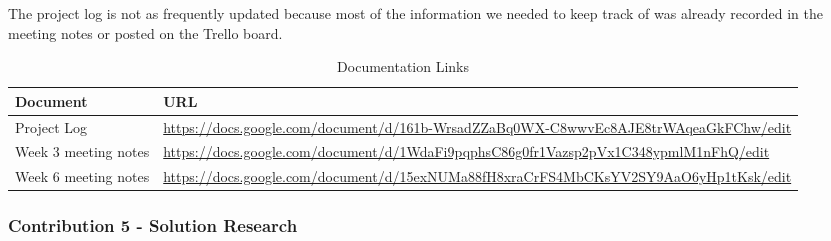 \documentclass{article}
\begin{document}
    The project log is not as frequently updated because most of the information we needed to keep track of was already recorded in the meeting notes or posted on the Trello board.

    \begin{xltabular}{\textwidth}{p{4cm} X}
    \caption{Documentation Links} \\
    \hline
    \textbf{Document} & \textbf{URL} \\
    \hline

    Project Log & \url{https://docs.google.com/document/d/161b-WrsadZZaBq0WX-C8wwvEc8AJE8trWAqeaGkFChw/edit} \\
    Week 3 meeting notes & \url{https://docs.google.com/document/d/1WdaFi9pqphsC86g0fr1Vazsp2pVx1C348ypmlM1nFhQ/edit} \\
    Week 6 meeting notes & \url{https://docs.google.com/document/d/15exNUMa88fH8xraCrFS4MbCKsYV2SY9AaO6yHp1tKsk/edit} \\

    \hline
    \end{xltabular}

\subsubsection*{Contribution 5 - Solution Research}
\end{document}
